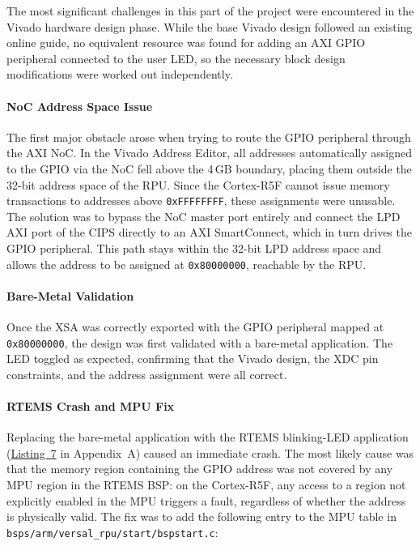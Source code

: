 \documentclass[
	a4paper,
]{CSMakotoTechnicalReport}
\begin{document}
The most significant challenges in this part of the project were encountered in the Vivado hardware design phase.
While the base Vivado design followed an existing online guide, no equivalent resource was found for adding an AXI GPIO peripheral connected to the user LED, so the necessary block design modifications were worked out independently.

\paragraph*{NoC Address Space Issue}

The first major obstacle arose when trying to route the GPIO peripheral through the AXI NoC.
In the Vivado Address Editor, all addresses automatically assigned to the GPIO via the NoC fell above the 4\,GB boundary, placing them outside the 32-bit address space of the RPU.
Since the Cortex-R5F cannot issue memory transactions to addresses above \texttt{0xFFFFFFFF}, these assignments were unusable.
The solution was to bypass the NoC master port entirely and connect the LPD AXI port of the CIPS directly to an AXI SmartConnect, which in turn drives the GPIO peripheral.
This path stays within the 32-bit LPD address space and allows the address to be assigned at \texttt{0x80000000}, reachable by the RPU.

\paragraph*{Bare-Metal Validation}

Once the XSA was correctly exported with the GPIO peripheral mapped at \texttt{0x80000000}, the design was first validated with a bare-metal application.
The LED toggled as expected, confirming that the Vivado design, the XDC pin constraints, and the address assignment were all correct.

\paragraph*{RTEMS Crash and MPU Fix}

Replacing the bare-metal application with the RTEMS blinking-LED application (\hyperref[lst:7]{Listing~7} in Appendix~A) caused an immediate crash.
The most likely cause was that the memory region containing the GPIO address was not covered by any MPU region in the RTEMS BSP: on the Cortex-R5F, any access to a region not explicitly enabled in the MPU triggers a fault, regardless of whether the address is physically valid.
The fix was to add the following entry to the MPU table in \texttt{bsps/arm/versal\_rpu/start/bspstart.c}:
\end{document}
